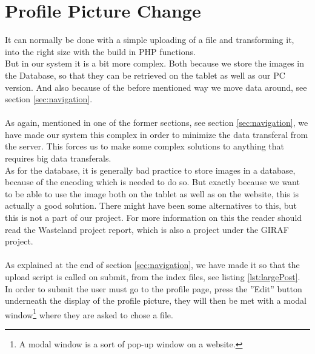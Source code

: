 \section{Profile Picture Change}
\label{sec:profilePicChange}
It can normally be done with a simple uploading of a file and transforming it, into the right size with the build in PHP functions.\\
But in our system it is a bit more complex. Both because we store the images in the Database, so that they can be retrieved on the tablet as well as our PC version. And also because of the before mentioned way we move data around, see section \ref{sec:navigation}.\\
\\
As again, mentioned in one of the former sections, see section \ref{sec:navigation}, we have made our system this complex in order to minimize the data transferal from the server. This forces us to make some complex solutions to anything that requires big data transferals.\\
As for the database, it is generally bad practice to store images in a database, because of the encoding which is needed to do so. But exactly because we want to be able to use the image both on the tablet as well as on the website, this is actually a good solution. There might have been some alternatives to this, but this is not a part of our project. For more information on this the reader should read the Wasteland project report, which is also a project under the GIRAF project.\\
\\	
As explained at the end of section \ref{sec:navigation}, we have made it so that the upload script is called on submit, from the index files, see listing \ref{lst:largePost}.\\
In order to submit the user must go to the profile page, press the ''Edit'' button underneath the display of the profile picture, they will then be met with a modal window\footnote{A modal window is a sort of pop-up window on a website.} where they are asked to chose a file.

